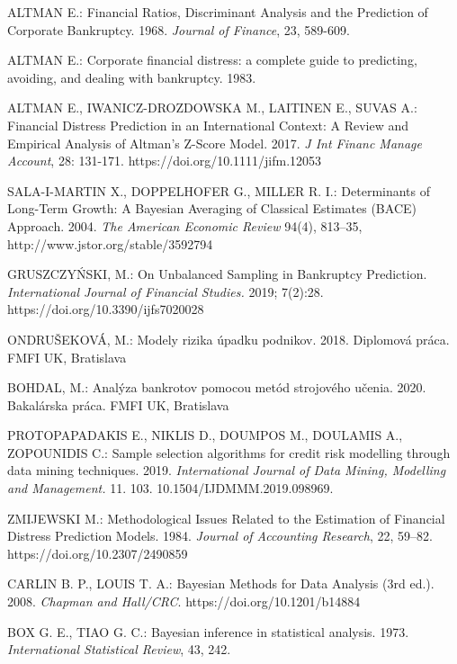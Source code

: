 \begin{thebibliography}{99}

     ALTMAN E.: Financial Ratios, Discriminant Analysis and the Prediction of Corporate Bankruptcy. 1968. \emph{Journal of Finance}, 23, 589-609. 

     ALTMAN E.: Corporate financial distress: a complete guide to predicting, avoiding, and dealing with bankruptcy. 1983.

     ALTMAN E., IWANICZ-DROZDOWSKA M., LAITINEN E., SUVAS A.:
    Financial Distress Prediction in an International Context: A Review and Empirical Analysis of Altman's Z-Score Model. 2017.
    \emph{J Int Financ Manage Account}, 28: 131-171. https://doi.org/10.1111/jifm.12053

     SALA-I-MARTIN X., DOPPELHOFER G., MILLER R. I.: Determinants of Long-Term Growth: A Bayesian Averaging of Classical Estimates (BACE) Approach. 2004.
    \emph{The American Economic Review} 94(4), 813–35, http://www.jstor.org/stable/3592794

     GRUSZCZYŃSKI, M.: On Unbalanced Sampling in Bankruptcy Prediction. \emph{International Journal of Financial Studies.} 2019; 7(2):28. https://doi.org/10.3390/ijfs7020028

     ONDRUŠEKOVÁ, M.: Modely rizika úpadku podnikov. 2018. Diplomová práca. FMFI UK, Bratislava
    
     BOHDAL, M.: Analýza bankrotov pomocou metód strojového učenia. 2020. Bakalárska práca. FMFI UK, Bratislava

     PROTOPAPADAKIS E., NIKLIS D., DOUMPOS M., DOULAMIS A., ZOPOUNIDIS C.: Sample selection algorithms for credit risk modelling through data mining techniques. 2019.
    \emph{International Journal of Data Mining, Modelling and Management.} 11. 103. 10.1504/IJDMMM.2019.098969.

     ZMIJEWSKI M.: Methodological Issues Related to the Estimation of Financial Distress Prediction Models. 1984. \emph{Journal of Accounting Research}, 22, 59–82. https://doi.org/10.2307/2490859

     CARLIN B. P., LOUIS T. A.: Bayesian Methods for Data Analysis (3rd ed.). 2008. \emph{Chapman and Hall/CRC}. https://doi.org/10.1201/b14884

     BOX G. E., TIAO G. C.: Bayesian inference in statistical analysis. 1973. \emph{International Statistical Review}, 43, 242.


\end{thebibliography}
